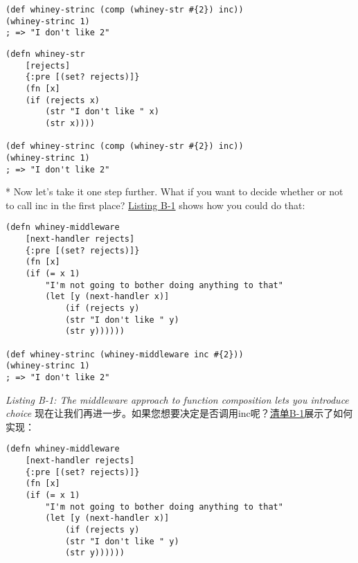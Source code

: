 \begin{paracol}{2}
\begin{verbatim}
(def whiney-strinc (comp (whiney-str #{2}) inc))
(whiney-strinc 1)
; => "I don't like 2"
\end{verbatim}
\switchcolumn
\begin{verbatim}
(defn whiney-str
    [rejects]
    {:pre [(set? rejects)]}
    (fn [x]
    (if (rejects x)
        (str "I don't like " x)
        (str x))))

(def whiney-strinc (comp (whiney-str #{2}) inc))
(whiney-strinc 1)
; => "I don't like 2"
\end{verbatim}
\switchcolumn[0]*
Now let's take it one step further. What if you want to decide whether
or not to call inc in the first place? \href{javascript:void(0)}{Listing
B-1} shows how you could do that:
\begin{verbatim}
(defn whiney-middleware
    [next-handler rejects]
    {:pre [(set? rejects)]}
    (fn [x]
    (if (= x 1)
        "I'm not going to bother doing anything to that"
        (let [y (next-handler x)]
            (if (rejects y)
            (str "I don't like " y)
            (str y))))))

(def whiney-strinc (whiney-middleware inc #{2}))
(whiney-strinc 1)
; => "I don't like 2"
\end{verbatim}
\emph{Listing B-1: The middleware approach to function composition lets
you introduce choice}
\switchcolumn
现在让我们再进一步。如果您想要决定是否调用inc呢？\href{javascript:void(0)}{清单B-1}展示了如何实现：
\begin{verbatim}
(defn whiney-middleware
    [next-handler rejects]
    {:pre [(set? rejects)]}
    (fn [x]
    (if (= x 1)
        "I'm not going to bother doing anything to that"
        (let [y (next-handler x)]
            (if (rejects y)
            (str "I don't like " y)
            (str y))))))


\end{verbatim}
\end{paracol}
